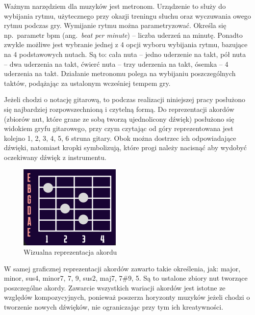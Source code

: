 Ważnym narzędziem dla muzyków jest metronom. Urządzenie to służy do wybijania rytmu, użytecznego przy okazji treningu słuchu oraz wyczuwania owego rytmu podczas gry. 
Wymijanie rytmu można parametryzować. Określa się np.\ parametr bpm (ang.~\emph{beat per minute}) -- liczba uderzeń na minutę. Ponadto zwykle możliwe jest wybranie jednej z 4 opcji wyboru wybijania rytmu, bazujące na 4 podstawowych nutach. Są to: cała nuta -- jedno uderzenie na takt, pół nuta -- dwa uderzenia na takt, ćwierć nuta -- trzy uderzenia na takt, ósemka -- 4 uderzenia na takt. Działanie metronomu polega na wybijaniu poszczególnych taktów, podążając za ustalonym wcześniej tempem gry. 

Jeżeli chodzi o notację gitarową, to podczas realizacji niniejszej pracy posłużono się najbardziej rozpowszechnioną i czytelną formą. Do reprezentacji akordów (zbiorów nut, które grane ze sobą tworzą ujednolicony dźwięk) posłużono się widokiem gryfu gitarowego, przy czym czytając od góry reprezentowana jest kolejno 1, 2, 3, 4, 5, 6 struna gitary. Obok można dostrzec ich odpowiadające dźwięki, natomiast kropki symbolizują, które progi należy nacisnąć aby wydobyć oczekiwany dźwięk z instrumentu.


\begin{figure}[htb]
	\centering
	\includegraphics[width=.5\linewidth]{rys02/akord2.2}
	\caption{Wizualna reprezentacja akordu} \label{fig:pageLayout}
\end{figure}

W samej graficznej reprezentacji akordów zawarto takie określenia, jak: major, minor, sus4, minor7, 7, 9, sus2, maj7, 7\#9, 5. Są to ustalone zbiory nut tworzące poszczególne akordy. Zawarcie wszystkich wariacji akordów jest istotne ze względów kompozycyjnych, ponieważ poszerza horyzonty muzyków jeżeli chodzi o tworzenie nowych dźwięków, nie ograniczając przy tym ich kreatywności. 

